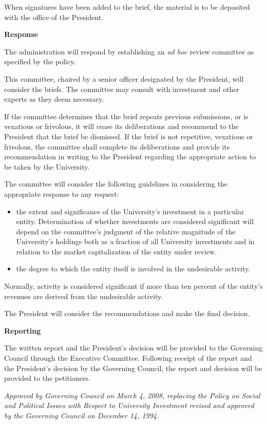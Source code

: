  

When signatures have been added to the brief, the material is to be deposited with the office of the President.

 

\textbf{Response}

 

The administration will respond by establishing an \emph{ad hoc} review committee as specified by the policy.

 

This committee, chaired by a senior officer designated by the President, will consider the briefs. The committee may consult with investment and other experts as they deem necessary.

 

If the committee determines that the brief repeats previous submissions, or is vexatious or frivolous, it will cease its deliberations and recommend to the President that the brief be dismissed. If the brief is not repetitive, vexatious or frivolous, the committee shall complete its deliberations and provide its recommendation in writing to the President regarding the appropriate action to be taken by the University.

 

The committee will consider the following guidelines in considering the appropriate response to any request:
\begin{itemize}
 	\item the extent and significance of the University's investment in a particular entity.  Determination of whether investments are considered significant will depend on the committee’s judgment of the relative magnitude of the University’s holdings both as a fraction of all University investments and in relation to the market capitalization of the entity under review.
	\item the degree to which the entity itself is involved in the undesirable activity.
\end{itemize}
Normally, activity is considered significant if more than ten percent of the entity's revenues are derived from the undesirable activity.

 

The President will consider the recommendations and make the final decision.

 

\textbf{Reporting}

 

The written report and the President's decision will be provided to the Governing Council through the Executive Committee. Following receipt of the report and the President’s decision by the Governing Council, the report and decision will be provided to the petitioners.

\emph{Approved by Governing Council on March 4, 2008, replacing the Policy on Social and Political Issues with Respect to University Investment revised and approved by the Governing Council on December 14, 1994.}
